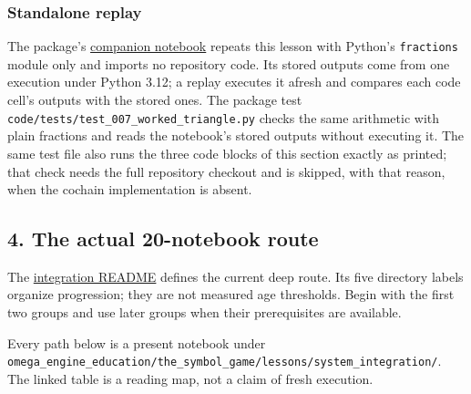 \documentclass[
  11pt,
]{article}
\newcommand{\passthrough}[1]{#1}
\begin{document}
\subsubsection{Standalone replay}\label{standalone-replay}

The package's
\href{https://github.com/dbccpage/the_symbol_game/blob/52cb5457f6c485ba548cfd292f6012a941ed22cf/omega_engine_atlas/coda_atlas/omega_engine_symbol_game/007_pfp_executable_lessons_and_evidence_boundaries/jupyter_notebooks/007_moving_a_discrepancy.ipynb}{companion
notebook} repeats this lesson with Python's
\passthrough{\lstinline!fractions!} module only and imports no
repository code. Its stored outputs come from one execution under Python
3.12; a replay executes it afresh and compares each code cell's outputs
with the stored ones. The package test
\nolinkurl{code/tests/test_007_worked_triangle.py} checks the same
arithmetic with plain fractions and reads the notebook's stored outputs
without executing it. The same test file also runs the three code blocks
of this section exactly as printed; that check needs the full repository
checkout and is skipped, with that reason, when the cochain
implementation is absent.

\subsection{4. The actual 20-notebook
route}\label{the-actual-20-notebook-route}

The
\href{https://github.com/dbccpage/the_symbol_game/blob/52cb5457f6c485ba548cfd292f6012a941ed22cf/omega_engine_education/the_symbol_game/lessons/system_integration/README.md}{integration
README} defines the current deep route. Its five directory labels
organize progression; they are not measured age thresholds. Begin with
the first two groups and use later groups when their prerequisites are
available.

Every path below is a present notebook under
\nolinkurl{omega_engine_education/the_symbol_game/lessons/system_integration/}.
The linked table is a reading map, not a claim of fresh execution.
\end{document}

